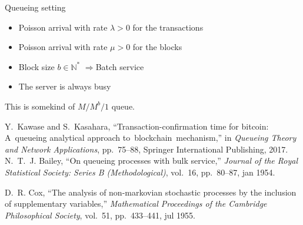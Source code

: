 \documentclass{beamer}
\begin{document}
\begin{frame}{Queueing setting}
\begin{itemize}
\item Poisson arrival with rate $\lambda>0$ for the transactions
\item Poisson arrival with rate $\mu>0$ for the blocks 
\item Block size $b\in\mathbb{N}^\ast$
$\Rightarrow $Batch service
\item[\warning] The server is always busy
\end{itemize}
This is somekind of $M/M^b/1$ queue.
\tiny
\begin{thebibliography}{1}
Y.~Kawase and S.~Kasahara, ``Transaction-confirmation time for bitcoin:
  A~queueing analytical approach to~blockchain~mechanism,'' in {\em Queueing
  Theory and Network Applications}, pp.~75--88, Springer International
  Publishing, 2017.
N.~T.~J. Bailey, ``On queueing processes with bulk service,'' {\em Journal of
  the Royal Statistical Society: Series B (Methodological)}, vol.~16,
  pp.~80--87, jan 1954.

D.~R. Cox, ``The analysis of non-markovian stochastic processes by the
  inclusion of supplementary variables,'' {\em Mathematical Proceedings of the
  Cambridge Philosophical Society}, vol.~51, pp.~433--441, jul 1955.

\end{thebibliography}
\end{frame}
\end{document}

